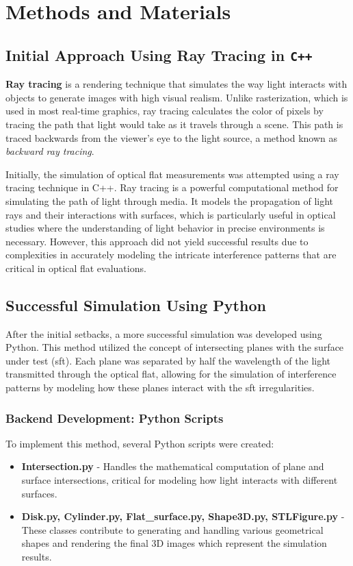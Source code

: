 \documentclass[../main.tex]{subfiles}
\begin{document}
{\let\clearpage\relax\chapter{Methods and Materials}}
\section{Initial Approach Using Ray Tracing in \texttt{C++}}
\textbf{Ray tracing} is a rendering technique that simulates the way light interacts with objects to generate images with high visual realism. Unlike rasterization, which is used in most real-time graphics, ray tracing calculates the color of pixels by tracing the path that light would take as it travels through a scene. This path is traced backwards from the viewer's eye to the light source, a method known as \textit{backward ray tracing}.

Initially, the simulation of optical flat measurements was attempted using a ray tracing technique in C++. Ray tracing is a powerful computational method for simulating the path of light through media. It models the propagation of light rays and their interactions with surfaces, which is particularly useful in optical studies where the understanding of light behavior in precise environments is necessary. However, this approach did not yield successful results due to complexities in accurately modeling the intricate interference patterns that are critical in optical flat evaluations.

\section{Successful Simulation Using Python}
After the initial setbacks, a more successful simulation was developed using Python. This method utilized the concept of intersecting planes with the surface under test (sft). Each plane was separated by half the wavelength of the light transmitted through the optical flat, allowing for the simulation of interference patterns by modeling how these planes interact with the sft irregularities.

\subsection{Backend Development: Python Scripts}
To implement this method, several Python scripts were created:
\begin{itemize}
    \item \textbf{Intersection.py} - Handles the mathematical computation of plane and surface intersections, critical for modeling how light interacts with different surfaces.
    \item \textbf{Disk.py, Cylinder.py, Flat\_surface.py, Shape3D.py, STLFigure.py} - These classes contribute to generating and handling various geometrical shapes and rendering the final 3D images which represent the simulation results.
\end{itemize}
\end{document}

